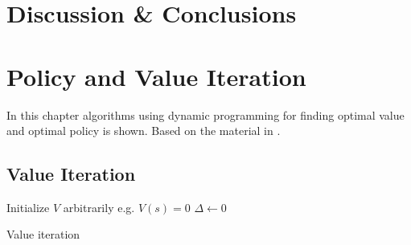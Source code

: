 \documentclass{kththesis}
\theoremstyle{definition}
\begin{document}
\chapter{Discussion \& Conclusions}

\printbibliography[heading=bibintoc] %

\appendix 


\chapter{Policy and Value Iteration}\label{app:A}
In this chapter algorithms using dynamic programming for finding optimal value and optimal policy is shown. Based on the material in \parencite{sutton1998reinforcement}.

\section{Value Iteration}
\LinesNumbered
\begin{algorithm}[H]
 \textsf{Initialize $V$ arbitrarily e.g. $V(s) = 0$} \;
 $\Delta \leftarrow 0$ \;
 \caption{Value iteration}
 \label{alg2}
\end{algorithm}
\end{document}
